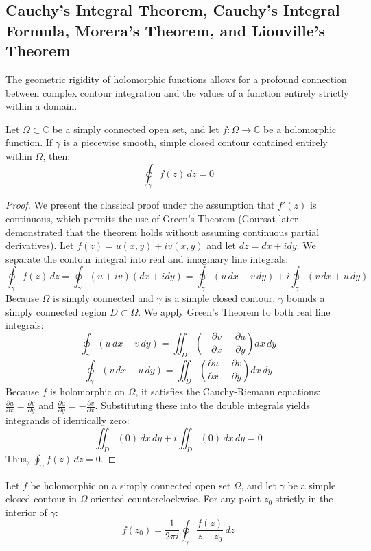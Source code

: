 \subsection{Cauchy's Integral Theorem, Cauchy's Integral Formula, Morera's Theorem, and Liouville's Theorem}

The geometric rigidity of holomorphic functions allows for a profound connection between complex contour integration and the values of a function entirely strictly within a domain. 

\begin{theorem}
Let $\Omega \subset \mathbb{C}$ be a simply connected open set, and let $f: \Omega \to \mathbb{C}$ be a holomorphic function. If $\gamma$ is a piecewise smooth, simple closed contour contained entirely within $\Omega$, then:
$$ \oint_\gamma f(z) \, dz = 0 $$
\end{theorem}

\begin{proof}
We present the classical proof under the assumption that $f'(z)$ is continuous, which permits the use of Green's Theorem (Goursat later demonstrated that the theorem holds without assuming continuous partial derivatives). Let $f(z) = u(x, y) + i v(x, y)$ and let $dz = dx + i dy$. We separate the contour integral into real and imaginary line integrals:
$$ \oint_\gamma f(z) \, dz = \oint_\gamma (u + iv)(dx + i dy) = \oint_\gamma (u \, dx - v \, dy) + i \oint_\gamma (v \, dx + u \, dy) $$
Because $\Omega$ is simply connected and $\gamma$ is a simple closed contour, $\gamma$ bounds a simply connected region $D \subset \Omega$. We apply Green's Theorem to both real line integrals:
$$ \oint_\gamma (u \, dx - v \, dy) = \iint_D \left( -\frac{\partial v}{\partial x} - \frac{\partial u}{\partial y} \right) dx \, dy $$
$$ \oint_\gamma (v \, dx + u \, dy) = \iint_D \left( \frac{\partial u}{\partial x} - \frac{\partial v}{\partial y} \right) dx \, dy $$
Because $f$ is holomorphic on $\Omega$, it satisfies the Cauchy-Riemann equations: $\frac{\partial u}{\partial x} = \frac{\partial v}{\partial y}$ and $\frac{\partial u}{\partial y} = -\frac{\partial v}{\partial x}$. Substituting these into the double integrals yields integrands of identically zero:
$$ \iint_D (0) \, dx \, dy + i \iint_D (0) \, dx \, dy = 0 $$
Thus, $\oint_\gamma f(z) \, dz = 0$.
\end{proof}

\begin{theorem}
Let $f$ be holomorphic on a simply connected open set $\Omega$, and let $\gamma$ be a simple closed contour in $\Omega$ oriented counterclockwise. For any point $z_0$ strictly in the interior of $\gamma$:
$$ f(z_0) = \frac{1}{2\pi i} \oint_\gamma \frac{f(z)}{z - z_0} \, dz $$
\end{theorem}

